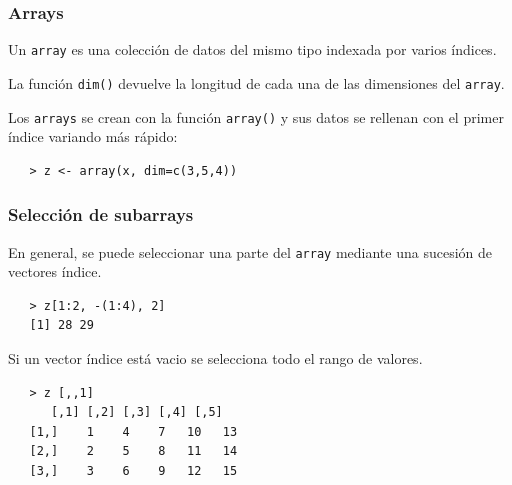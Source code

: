 \documentclass{beamer}
\newenvironment{wideitemize}{\itemize\addtolength{\itemsep}{10pt}}{\enditemize}
\begin{document}
\begin{frame}[fragile]
\frametitle{Arrays}
\begin{wideitemize}
\item Un \texttt{array} es una colección de datos del mismo tipo indexada por varios índices.
\item La función \texttt{dim()} devuelve la longitud de cada una de las dimensiones del \texttt{array}.
\item Los \texttt{arrays} se crean con la función \texttt{array()} y sus datos se rellenan con el primer índice variando más rápido:
\begin{verbatim}
   > z <- array(x, dim=c(3,5,4))
\end{verbatim}
\end{wideitemize}
\end{frame}

\begin{frame}
\frametitle{Selección de subarrays}

\begin{wideitemize}
\item En general, se puede seleccionar una parte del \texttt{array} mediante una sucesión de vectores índice.
\begin{verbatim}
   > z[1:2, -(1:4), 2]
   [1] 28 29
\end{verbatim}
\item Si un vector índice está vacio se selecciona todo el rango de valores.
\begin{verbatim}
   > z [,,1]
      [,1] [,2] [,3] [,4] [,5]
   [1,]    1    4    7   10   13
   [2,]    2    5    8   11   14
   [3,]    3    6    9   12   15
\end{verbatim}
\end{wideitemize}
\end{frame}
\end{document}

